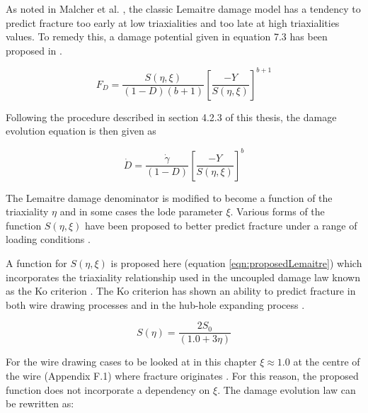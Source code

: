 \documentclass[sn-mathphys,Numbered,draft]{sn-jnl}%
\begin{document}
As noted in Malcher et al. \cite{malcher_improved_2014}, the classic Lemaitre damage model has a tendency to predict fracture too early at low triaxialities and too late at high triaxialities values. To remedy this, a damage potential given in equation 7.3 has been  proposed in \citet{malcher_improved_2014}.

\begin{equation}
	F_{D}=\frac{S(\eta,\xi)}{\left(1-D\right)\left(b+1\right)}\left[\frac{-Y}{S(\eta,\xi)}\right]^{b+1}
\end{equation}

 Following the procedure described in section 4.2.3 of this thesis, the damage evolution equation is then given as

 \begin{equation}
	\dot{D}=\frac{\dot{\gamma}}{\left(1-D\right)}\left[\frac{-Y}{S(\eta,\xi)}\right]^b
\end{equation}

The Lemaitre damage denominator is modified to become a function of the triaxiality $\eta$ and in some cases the lode parameter $\xi$. Various forms of the function $S(\eta,\xi)$ have been proposed to better predict fracture under a range of loading conditions \cite{ferreira_improved_2022,castro_calibration_2018}. 

A function for $S(\eta,\xi)$ is proposed here (equation \ref{eqn:proposedLemaitre}) which incorporates the triaxiality relationship used in the uncoupled damage law known as the Ko criterion \cite{ko_prediction_2007}. The Ko criterion has shown an ability to predict fracture in both wire drawing processes \cite{roh_process_2021} and in the hub-hole expanding process \cite{ko_prediction_2007}.

\begin{equation}
\label{eqn:proposedLemaitre}
S(\eta)=\frac{2S_0}{\left(1.0+3\eta\right)}
\end{equation}

For the wire drawing cases to be looked at in this chapter $\xi\approx1.0$ at the centre of the wire (Appendix F.1) where fracture originates \cite{roh_process_2021}. For this reason, the proposed function does not incorporate a dependency on $\xi$. The damage evolution law can be rewritten as:


\end{document}
